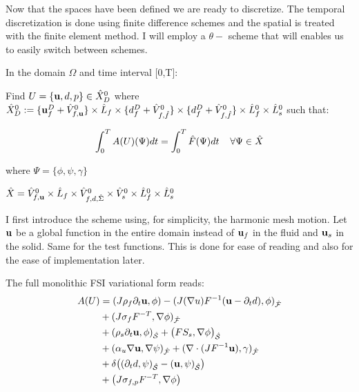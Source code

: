 Now that the spaces have been defined we are ready to discretize. The temporal discretization is done using finite difference schemes and the spatial is treated with the finite element method. I will employ a $\theta-$ scheme that will enables us to easily switch between schemes.

In the domain $\Omega$ and time interval [0,T]:

Find $ U = \{\bold{u}, d, p\} \in \hat{X}^0_D $ where $ \hat{X}^0_D := \{ \bold{u}^D_f + \hat{V}^0_{f,\bold{u}} \} \times \hat{L}_f \times \{ d_f^D + \hat{V}^0_{f,\hat{f}} \} \times \{ d_f^D + \hat{V}^0_{f,\hat{f}} \} \times \hat{L}^0_f \times \hat{L}^0_s  $ such that:

\begin{equation}
\int_0^T A(U)(\Psi) dt = \int_0^T \hat{F}(\Psi) dt \hspace{4mm} \forall  \Psi \in \hat{X}
\end{equation}

where $ \Psi = \{\phi, \psi, \gamma \} $%

 $\hat{X} = \hat{V}^0_{f,\bold{u}} \times \hat{L}_f \times \hat{V}^0_{f,d,\hat{\Sigma}} \times \hat{V}_s^0 \times \hat{L}_f^0 \times \hat{L}_s^0  $


I first introduce the scheme using, for simplicity, the harmonic mesh motion. Let $\bold{u}$ be a global function in the entire domain instead of $\bold{u}_f$ in the fluid and $\bold{u}_s$ in the solid. Same for the test functions. This is done for ease of reading and also for the ease of implementation later.

The full monolithic FSI variational form reads:
\begin{align}
A(U)&= (J \rho_f \partial_t \bold{u} , \phi ) - (J (\nabla u)F^{-1}(\bold{u} - \partial_t d) , \phi )_{\mathcal{\hat{F}}}  \\
       &+ ( J \sigma_{f} F^{-T} , \nabla \phi )_{\mathcal{\hat{F}}} \\
       &+ (\rho_s \partial_t \bold{u} , \phi)_{\mathcal{\hat{S}}}   + \big(F S_s, \nabla \phi \big)_{\mathcal{\hat{S}}} \\
       &+ ( \alpha_u \nabla \bold{u}, \nabla \psi)_{\mathcal{\hat{F}}} + (\nabla \cdot (J F^{-1} \bold{u}),\gamma )_{\mathcal{\hat{F}}} \\
       \label{eq:condition}
       &+ \delta\big((\partial_t d , \psi)_{\mathcal{\hat{S}}}  - ( \bold{u} , \psi )_{\mathcal{\hat{S}}}\big) \\ 
       &+  \big( J \sigma_{f,p} F^{-T}, \nabla \phi  \big) 	 		
\end{align}

